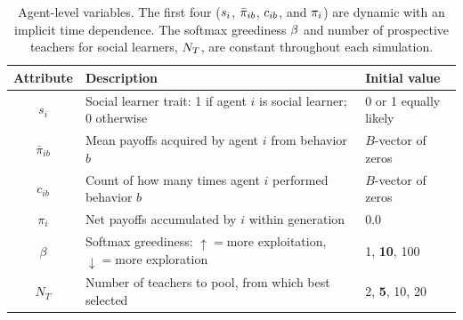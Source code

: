 \documentclass[letterpaper,11.5pt]{scrartcl}
\begin{document}

\begin{table}[h]
  \vspace{2em}
  \caption{Agent-level variables. The first four ($\protect s_i$, $\protect
    \bar\pi_{ib}$, $\protect c_{ib}$,
  and $\protect \pi_i$) are dynamic with an implicit time dependence. The softmax
greediness $\protect \beta$ and number of prospective teachers for social learners,
$\protect N_T$, are constant throughout each simulation.}
    \label{tab:modelParameters}
    \centering \hspace{-1em}
    \begin{tabular}{cp{4.5in}p{1.25in}} \toprule

        Attribute & Description & Initial value \\ 

        \midrule  

        $s_i$  & Social learner trait: 1 if agent $i$ is social learner; 0 otherwise & 0
        or 1 equally likely \\

        $\bar\pi_{ib}$ & Mean payoffs acquired by agent $i$ from behavior $b$
                       & $B$-vector of zeros \\

        $c_{ib}$ & Count of how many times agent $i$ performed behavior $b$ 
              & $B$-vector of zeros \\

        $\pi_i$ & Net payoffs accumulated by $i$ within generation & 0.0 \\

        $\beta$ & Softmax greediness: $\uparrow=$more exploitation, $\downarrow=$more
                    exploration 
               & 1, \textbf{10}, 100 \\
        
        $N_T$    & Number of teachers to pool, from which best selected 
                 & 2, \textbf{5}, 10, 20  \\

        \bottomrule
    \end{tabular}
\end{table}
\end{document}
